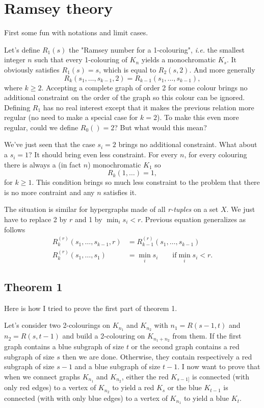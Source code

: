 \section{Ramsey theory}

First some fun with notations and limit cases.

Let's define $R_1(s)$ the "Ramsey number for a 1-colouring",
\textit{i.e.} the smallest integer $n$ such that every 1-colouring of $K_n$ yields a monochromatic $K_s$.
It obviously satisfies $R_1(s) = s$, which is equal to $R_2(s,2)$. And more generally
\begin{equation}
    R_k(s_1,\dots,s_{k-1},2) = R_{k-1}(s_1,\dots,s_{k-1}) ,
    \nonumber
\end{equation}
where $k \geq 2$. Accepting a complete graph of order 2 for some colour brings no additional constraint on the order of the graph so this colour can be ignored.
Defining $R_1$ has no real interest except that it makes the previous relation more regular (no need to make a special case for $k=2$).
To make this even more regular, could we define $R_0() = 2$? But what would this mean?

We've just seen that the case $s_i = 2$ brings no additional constraint. What about a $s_i = 1$? It should bring even less constraint.
For every $n$, for every colouring there is always a (in fact $n$) monochromatic $K_1$ so
\begin{equation}
    R_k(1,\dots)=1 ,
    \nonumber
\end{equation}
for $k \geq 1$.
This condition brings so much less constraint to the problem that there is no more contraint and any $n$ satisfies it.


The situation is similar for hypergraphs made of all \emph{r-tuples} on a set $X$.
We just have to replace 2 by $r$ and 1 by $\min_i s_i < r$.
Previous equation generalizes as follows
\begin{align}
    R_k^{(r)}(s_1,\dots,s_{k-1},r) & = R_{k-1}^{(r)}(s_1,\dots,s_{k-1}) \nonumber \\
    R_k^{(r)}(s_1,\dots,s_1) & = \min_i s_i \qquad \text{if} \min_i s_i < r . \nonumber
\end{align}

\subsection{Theorem 1}

Here is how I tried to prove the first part of theorem 1.

Let's consider two 2-colourings on $K_{n_1}$ and $K_{n_2}$ with $n_1 = R(s-1,t)$ and $n_2 = R(s,t-1)$ and build a 2-colouring on $K_{n_1 + n_2}$ from them.
If the first graph contains a blue subgraph of size $t$ or the second graph contains a red subgraph of size $s$ then we are done.
Otherwise, they contain respectively a red subgraph of size $s-1$ and a blue subgraph of size $t-1$.
I now want to prove that when we connect graphs $K_{n_1}$ and $K_{n_2}$,
either the red $K_{s-1]}$ is connected (with only red edges) to a vertex of $K_{n_2}$ to yield a red $K_s$
or the blue $K_{t-1}$ is connected (with with only blue edges) to a vertex of $K_{n_1}$ to yield a blue $K_t$.

